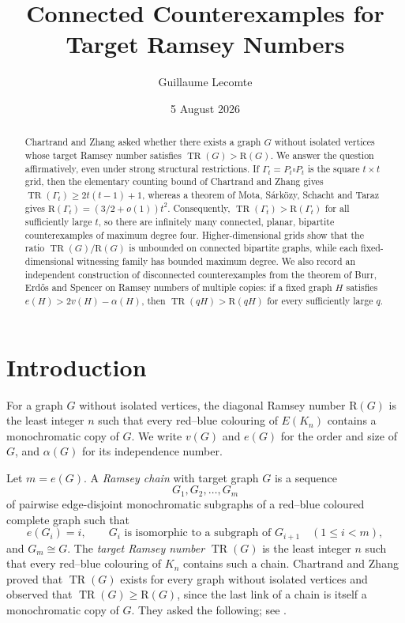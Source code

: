 \documentclass[11pt,reqno]{amsart}
\theoremstyle{plain}
\theoremstyle{definition}
\theoremstyle{remark}
\DeclareMathOperator{\TR}{TR}
\newcommand{\R}{\mathrm{R}}
\begin{document}
\title{Connected Counterexamples for Target Ramsey Numbers}

\author{Guillaume Lecomte}
\address{Independent researcher, Paris, France}

\date{5 August 2026}


\begin{abstract}
Chartrand and Zhang asked whether there exists a graph $G$ without isolated vertices whose target Ramsey number satisfies $\TR(G) > \R(G)$. We answer the question affirmatively, even under strong structural restrictions. If $\Gamma_t = P_t \square P_t$ is the square $t \times t$ grid, then the elementary counting bound of Chartrand and Zhang gives $\TR(\Gamma_t) \geq 2t(t-1)+1$, whereas a theorem of Mota, S\'ark\"ozy, Schacht and Taraz gives $\R(\Gamma_t) = (3/2 + o(1))t^2$. Consequently, $\TR(\Gamma_t) > \R(\Gamma_t)$ for all sufficiently large $t$, so there are infinitely many connected, planar, bipartite counterexamples of maximum degree four. Higher-dimensional grids show that the ratio $\TR(G)/\R(G)$ is unbounded on connected bipartite graphs, while each fixed-dimensional witnessing family has bounded maximum degree. We also record an independent construction of disconnected counterexamples from the theorem of Burr, Erd\H{o}s and Spencer on Ramsey numbers of multiple copies: if a fixed graph $H$ satisfies $e(H) > 2v(H) - \alpha(H)$, then $\TR(qH) > \R(qH)$ for every sufficiently large $q$.
\end{abstract}

\maketitle

\section{Introduction}

For a graph $G$ without isolated vertices, the diagonal Ramsey number $\R(G)$ is the least integer $n$ such that every red--blue colouring of $E(K_n)$ contains a monochromatic copy of $G$. We write $v(G)$ and $e(G)$ for the order and size of $G$, and $\alpha(G)$ for its independence number.

Let $m = e(G)$. A \emph{Ramsey chain} with target graph $G$ is a sequence
\[
G_1, G_2, \ldots, G_m
\]
of pairwise edge-disjoint monochromatic subgraphs of a red--blue coloured complete graph such that
\[
e(G_i) = i, \qquad G_i \text{ is isomorphic to a subgraph of } G_{i+1} \quad (1 \leq i < m),
\]
and $G_m \cong G$. The \emph{target Ramsey number} $\TR(G)$ is the least integer $n$ such that every red--blue colouring of $K_n$ contains such a chain. Chartrand and Zhang proved that $\TR(G)$ exists for every graph without isolated vertices and observed that $\TR(G) \geq \R(G)$, since the last link of a chain is itself a monochromatic copy of $G$. They asked the following; see \cite{CZ1,CZ2}.
\end{document}
